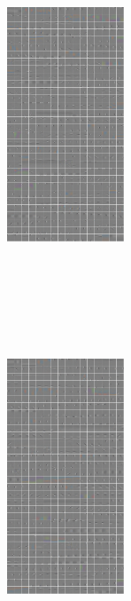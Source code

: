 \documentclass[12pt,a4paper]{report}
\begin{document}
\begin{figure}
\centering 
\begin{subfigure}
		\centering 
		\includegraphics[width=3.5cm, height=10cm]{./decoder_images/gsc_05.png}
    \end{subfigure} 
	\begin{subfigure}
		\centering 
		\includegraphics[width=3.5cm, height=10cm]{./decoder_images/gsc_10.png}
	\end{subfigure} 
	\begin{subfigure}
		\centering 

\end{subfigure}
\end{figure}
\end{document}
